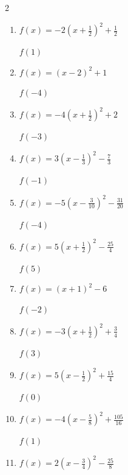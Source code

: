 \begin{multicols}{2}
\begin{enumerate}
$f(4)$
        \phantom{$=-13$}

  \item $\displaystyle f(x)=-2\left( x+\frac{1}{2}\right)^{2}+\frac{1}{2}$

$f(1)$
        \phantom{$=-4$}

  \item $\displaystyle f(x)=\left( x-2\right)^{2}+1$

$f(-4)$
        \phantom{$=37$}

  \item $\displaystyle f(x)=-4\left( x+\frac{1}{2}\right)^{2}+2$

$f(-3)$
        \phantom{$=-23$}

  \item $\displaystyle f(x)=3\left( x-\frac{1}{3}\right)^{2}-\frac{7}{3}$

$f(-1)$
        \phantom{$=3$}

\columnbreak %

\resetques

  \item $\displaystyle f(x)=-5\left( x-\frac{3}{10}\right)^{2}-\frac{31}{20}$

$f(-4)$
        \phantom{$=-94$}

  \item $\displaystyle f(x)=5\left( x+\frac{1}{2}\right)^{2}-\frac{25}{4}$

$f(5)$
        \phantom{$=145$}

  \item $\displaystyle f(x)=\left( x+1\right)^{2}-6$

$f(-2)$
        \phantom{$=-5$}

  \item $\displaystyle f(x)=-3\left( x+\frac{1}{2}\right)^{2}+\frac{3}{4}$

$f(3)$
        \phantom{$=-36$}

  \item $\displaystyle f(x)=5\left( x-\frac{1}{2}\right)^{2}+\frac{15}{4}$

$f(0)$
        \phantom{$=5$}

\columnbreak %

  \item $\displaystyle f(x)=-4\left( x-\frac{5}{8}\right)^{2}+\frac{105}{16}$

$f(1)$
        \phantom{$=6$}

  \item $\displaystyle f(x)=2\left( x-\frac{3}{4}\right)^{2}-\frac{25}{8}$


\end{enumerate}
\end{multicols}
